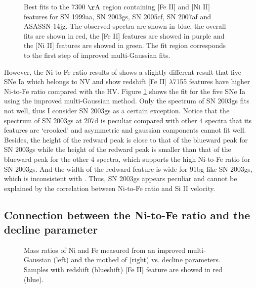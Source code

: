 \documentclass[twocolumn]{aastex631}
\begin{document}
\begin{figure}[ht!]
\caption{Best fits to the 7300 $\rm \AA$ region containing [Fe II] and [Ni II] features for SN 1999aa, SN 2003gs, SN 2005cf, SN 2007af and ASASSN-14jg. The observed spectra are shown in blue, the overall fits are shown in red, the [Fe II] features are showed in purple and the [Ni II] features are showed in green. The fit region corresponds to the first step of improved multi-Gaussian fits.}
\label{fig:difference}
\end{figure}

However, the Ni-to-Fe ratio results of \citet{2020MNRAS.491.2902F} shows a slightly different result that five SNe Ia which belongs to NV and show redshift [Fe II] $\lambda$7155 features have higher Ni-to-Fe ratio compared with the HV. Figure \ref{fig:difference} shows the fit for the five SNe Ia using the improved multi-Gaussian method. Only the spectrum of SN 2003gs fits not well, thus I consider SN 2003gs as a certain exception. Notice that the spectrum of SN 2003gs at 207d is peculiar compared with other 4 spectra that its features are ‘crooked’ and asymmetric and gaussian components cannot fit well. Besides, the height of the redward peak is close to that of the blueward peak for SN 2003gs while the height of the redward peak is smaller than that of the blueward peak for the other 4 spectra, which supports the high Ni-to-Fe ratio for SN 2003gs. And the width of the redward feature is wide for 91bg-like SN 2003gs, which is inconsistent with \citet{2013MNRAS.430.1030S}. Thus, SN 2003gs appears peculiar and cannot be explained by the correlation between Ni-to-Fe ratio and Si II velocity.

\subsection{Connection between the Ni-to-Fe ratio and the decline parameter \label{subsec:ratio_15}}

\begin{figure}[ht!]
\caption{Mass ratios of Ni and Fe measured from an improved multi-Gaussian (left) and the mothed of \citet{2020MNRAS.491.2902F} (right) vs. decline parameters. Samples with redshift (blueshift) [Fe II] feature are showed in red (blue).}
\label{fig:R_15_comp}
\end{figure}
\end{document}
